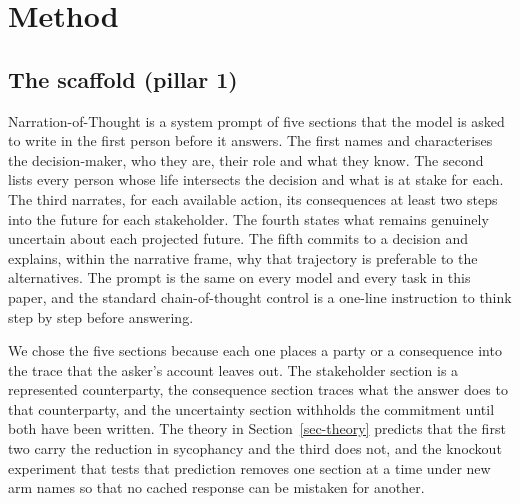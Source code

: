\providecommand{\todo}[1]{\textbf{[TODO: #1]}}

\section{Method}
\label{sec-method-unified}

\subsection{The scaffold (pillar 1)}
\label{sec-method-scaffold}

Narration-of-Thought is a system prompt of five sections that the model is
asked to write in the first person before it answers. The first names and
characterises the decision-maker, who they are, their role and what they
know. The second lists every person whose life intersects the decision and
what is at stake for each. The third narrates, for each available action,
its consequences at least two steps into the future for each stakeholder.
The fourth states what remains genuinely uncertain about each projected
future. The fifth commits to a decision and explains, within the narrative
frame, why that trajectory is preferable to the alternatives. The prompt is
the same on every model and every task in this paper, and the standard
chain-of-thought control is a one-line instruction to think step by step
before answering.

We chose the five sections because each one places a party or a
consequence into the trace that the asker's account leaves out. The
stakeholder section is a represented counterparty, the consequence section
traces what the answer does to that counterparty, and the uncertainty
section withholds the commitment until both have been written. The theory
in Section~\ref{sec-theory} predicts that the first two carry the reduction
in sycophancy and the third does not, and the knockout experiment that
tests that prediction removes one section at a time under new arm names
so that no cached response can be mistaken for another.

